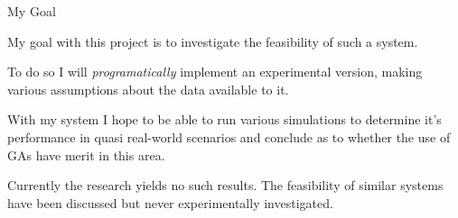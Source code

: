 \documentclass{beamer} \usepackage{pgfpages} \setbeamertemplate{bibliography item}{\insertbiblabel}
\begin{document}
\begin{frame}{My Goal}


    My goal with this project is to investigate the feasibility of such a system. 

    To do so I will \textit{programatically} implement an experimental version, making various assumptions about the data available to it.

    With my system I hope to be able to run various simulations to determine it's performance in quasi real-world scenarios and conclude as to whether the use of GAs have merit in this area. 

    Currently the research yields no such results. The feasibility of similar systems have been discussed\cite{kalaOnroadIntelligentVehicles2016} but never experimentally investigated.
    
\end{frame}
\end{document}
